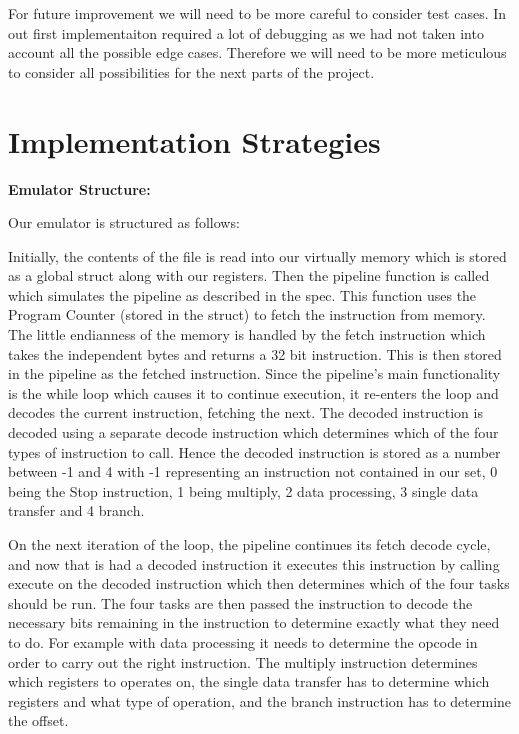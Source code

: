 \documentclass{article}
\newcommand{\tmtextbf}[1]{{\bfseries{#1}}}
\begin{document}
For future improvement we will need to be more careful to consider test cases. 
In out first implementaiton required a lot of debugging as we had not taken into
account all the possible edge cases. Therefore we will need to be more meticulous
to consider all possibilities for the next parts of the project. \newline



\newpage 
\section{Implementation Strategies}
\begin{paragraph}
\tab
\end{paragraph}

\tmtextbf{Emulator Structure:}

Our emulator is structured as follows:

Initially, the contents of the file is read into our virtually memory which is
stored as a global struct along with our registers. Then the pipeline function
is called which simulates the pipeline as described in the spec. This function
uses the Program Counter (stored in the struct) to fetch the instruction from
memory. The little endianness of the memory is handled by the fetch instruction which
takes the independent bytes and returns a 32 bit instruction. This is then
stored in the pipeline as the fetched instruction. Since the pipeline's main
functionality is the while loop which causes it to continue execution, it
re-enters the loop and decodes the current instruction, fetching the next. The
decoded instruction is decoded using a separate decode instruction which
determines which of the four types of instruction to call. Hence the decoded
instruction is stored as a number between -1 and 4 with -1 representing an instruction not 
contained in our set, 0 being the Stop instruction, 1 being
multiply, 2 data processing, 3 single data transfer and 4 branch.\newline

On the next iteration of the loop, the pipeline continues its fetch decode
cycle, and now that is had a decoded instruction it executes this instruction
by calling execute on the decoded instruction which then determines which of
the four tasks should be run. The four tasks are then passed the instruction
to decode the necessary bits remaining in the instruction to determine exactly
what they need to do. For example with data processing it needs to determine
the opcode in order to carry out the right instruction. The multiply
instruction determines which registers to operates on, the single data
transfer has to determine which registers and what type of operation, and the
branch instruction has to determine the offset.\newline
\end{document}
